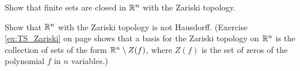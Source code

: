 \item 

\ba

\item Show that finite sets are closed in $\mathbb{R}^n$ with the Zariski topology.

\item Show that $\mathbb{R}^n$ with the Zariski topology is not Hausdorff. (Exercise \ref{ex:TS_Zariski} on page \pageref{ex:TS_Zariski} shows that a basis for the Zariski topology on $\mathbb{R}^n$ is the collection of sets of the form $\mathbb{R}^n \setminus Z(f)$, where $Z(f)$ is the set of zeros of the polynomial $f$ in $n$ variables.)

\ea

\begin{comment} 

\ExerciseSolution 

\ba

\item Let $S = \{s_1, s_2, \ldots, s_k\}$ be a finite subset of $\R^n$. For $i$ from $1$ to $k$ let $f_i \in \mathcal{P}_n$ be defined by $f(x) = x-s_i$. Then $Z(f_i) = \{s_i\}$. So $S = \bigcup_{1 \leq i \leq k} Z(f_i)$ which is a finite union of closed sets so is closed in $\R^n$ with the Zariski topology. 

\item Let $a$ and $b$ be in $\R^n$. Then there are basis elements $B_1$ and $B_2$ such that $a \in B_1$ and $b \in B_2$. Now $B_1 = \R^n \setminus Z(f)$ and $B_2 = \R^n \setminus Z(g)$ for some $f$ and $g$ in $\mathcal{P}_n$. Now $f$ and $g$ each have only finitely many zeros, so $Z(f)$ and $Z(g)$ are both finite sets. It follows that $B_1 \cap B_2$ is an infinite set. Thus, any two open sets that contain $a$ and $b$ must have a non-trivial intersection and so $\R^n$ with the Zariski topology is not Hausdorff.

\ea

\end{comment}

